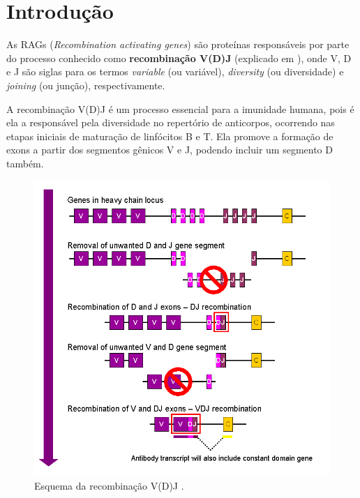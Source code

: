 \documentclass[
	12pt,				%
	openright,			%
	twoside,			%
	a4paper,			%
	]{abntex2}
\begin{document}
\textual


\chapter{Introdução}

As RAGs (\textit{Recombination activating genes}) são proteínas responsáveis por parte do processo conhecido como \textbf{recombinação V(D)J} (explicado em ), onde V, D e J são siglas para os termos \textit{variable} (ou variável), \textit{diversity} (ou diversidade) e \textit{joining} (ou junção), respectivamente.

A recombinação V(D)J é um processo essencial para a imunidade humana, pois é ela a responsável pela diversidade no repertório de anticorpos, ocorrendo nas etapas iniciais de maturação de linfócitos B e T. Ela promove a formação de exons a partir dos segmentos gênicos V e J, podendo incluir um segmento D também.


\begin{figure}
	\centering
	\includegraphics[width=1\linewidth]{VDJ_recombination}
	\caption[Esquema da recombinação V(D)J.]{Esquema da recombinação V(D)J \cite{fig:RAGscheme}.}
	\label{fig:vdjrecombination}
\end{figure}
\end{document}
